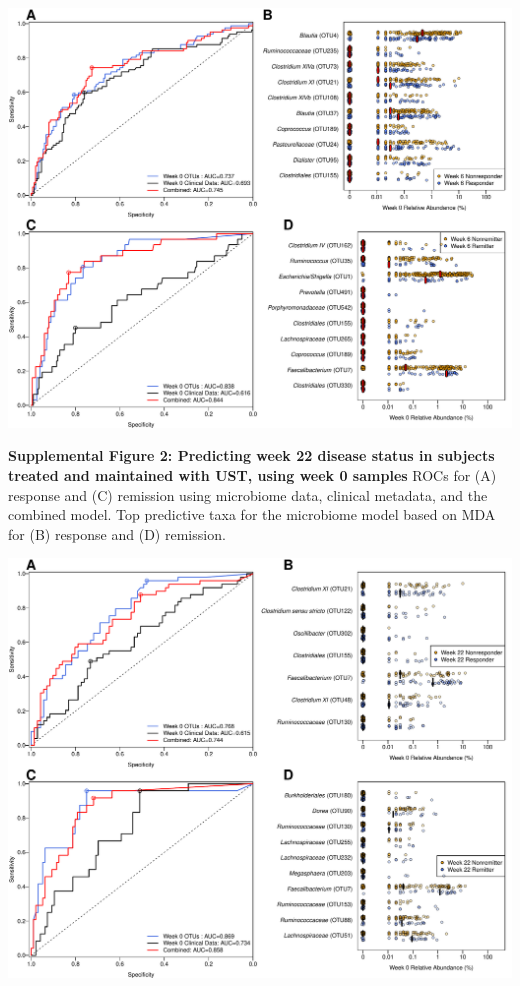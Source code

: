 \documentclass[11pt,]{article}
\begin{document}
\includegraphics{figures/Figure6_wk0Xwk6pred.pdf}

\newpage

\textbf{Supplemental Figure 2: Predicting week 22 disease status in
subjects treated and maintained with UST, using week 0 samples} ROCs for
(A) response and (C) remission using microbiome data, clinical metadata,
and the combined model. Top predictive taxa for the microbiome model
based on MDA for (B) response and (D) remission.

\includegraphics{figures/SF2-wk22predfig.pdf}
\end{document}
